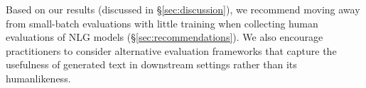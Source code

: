 Based on our results (discussed in \S\ref{sec:discussion}), we recommend moving away from small-batch evaluations with little training when collecting human evaluations of NLG models (\S\ref{sec:recommendations}).
We also encourage practitioners to consider alternative evaluation frameworks that capture the usefulness of generated text in downstream settings rather than its humanlikeness.
